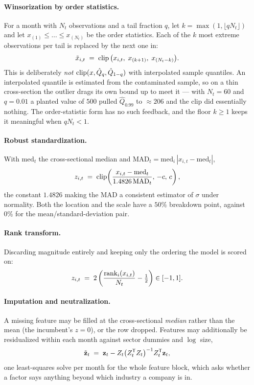 \documentclass[11pt]{article}
\begin{document}
\paragraph{Winsorization by order statistics.}
For a month with $N_t$ observations and a tail fraction $q$, let $k=\max(1,\lfloor
qN_t\rfloor)$ and let $x_{(1)}\le\dots\le x_{(N_t)}$ be the order statistics. Each of
the $k$ most extreme observations per tail is replaced by the next one in:
\begin{equation}
  \tilde x_{i,t} \;=\; \operatorname{clip}\big(x_{i,t},\; x_{(k+1)},\; x_{(N_t-k)}\big).
\end{equation}
This is deliberately \emph{not} $\operatorname{clip}(x,\hat Q_q,\hat Q_{1-q})$ with interpolated
sample quantiles. An interpolated quantile is estimated from the contaminated sample,
so on a thin cross-section the outlier drags its own bound up to meet it --- with
$N_t=60$ and $q=0.01$ a planted value of $500$ pulled $\hat Q_{0.99}$ to $\approx206$
and the clip did essentially nothing. The order-statistic form has no such feedback,
and the floor $k\ge1$ keeps it meaningful when $qN_t<1$.

\paragraph{Robust standardization.}
With $\mathrm{med}_t$ the cross-sectional median and
$\mathrm{MAD}_t=\mathrm{med}_i\,|x_{i,t}-\mathrm{med}_t|$,
\begin{equation}
  z_{i,t} \;=\; \operatorname{clip}\!\left(\frac{x_{i,t}-\mathrm{med}_t}{1.4826\,\mathrm{MAD}_t},
  \,-c,\,c\right),
\end{equation}
the constant $1.4826$ making the MAD a consistent estimator of $\sigma$ under
normality. Both the location and the scale have a $50\%$ breakdown point, against
$0\%$ for the mean/standard-deviation pair.

\paragraph{Rank transform.}
Discarding magnitude entirely and keeping only the ordering the model is scored on:
\begin{equation}
  z_{i,t} \;=\; 2\left(\frac{\operatorname{rank}_i(x_{i,t})}{N_t}-\tfrac12\right)\in[-1,1].
\end{equation}

\paragraph{Imputation and neutralization.}
A missing feature may be filled at the cross-sectional \emph{median} rather than the
mean (the incumbent's $z=0$), or the row dropped. Features may additionally be
residualized within each month against sector dummies and $\log$ size,
\begin{equation}
  \tilde{\mathbf z}_t \;=\; \mathbf z_t - Z_t\big(Z_t^{\mathsf{T}} Z_t\big)^{-1}Z_t^{\mathsf{T}}\mathbf z_t ,
\end{equation}
one least-squares solve per month for the whole feature block, which asks whether a
factor says anything beyond which industry a company is in.
\end{document}
